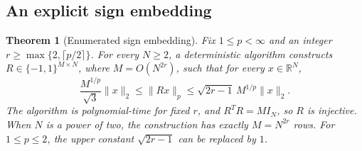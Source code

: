 \documentclass[11pt,letterpaper]{article}
\numberwithin{equation}{section}
\newtheorem{theorem}{Theorem}[section]
\theoremstyle{definition}
\theoremstyle{remark}
\newcommand{\R}{\mathbb R}
\begin{document}
\subsection{An explicit sign embedding}
\begin{theorem}[Enumerated sign embedding]\label{thm:embedding}
Fix $1\le p<\infty$ and an integer $r\ge\max\{2,\lceil p/2\rceil\}$. For every $N\ge2$, a deterministic algorithm constructs $R\in\{-1,1\}^{M\times N}$, where $M=O(N^{2r})$, such that for every $x\in\R^N$,
\begin{equation}\label{eq:embedding}
 \frac{M^{1/p}}{\sqrt3}\|x\|_2
 \le\|Rx\|_p
 \le\sqrt{2r-1}\,M^{1/p}\|x\|_2.
\end{equation}
The algorithm is polynomial-time for fixed $r$, and $R^TR=MI_N$, so $R$ is injective. When $N$ is a power of two, the construction has exactly $M=N^{2r}$ rows. For $1\le p\le2$, the upper constant $\sqrt{2r-1}$ can be replaced by $1$.
\end{theorem}
\end{document}
